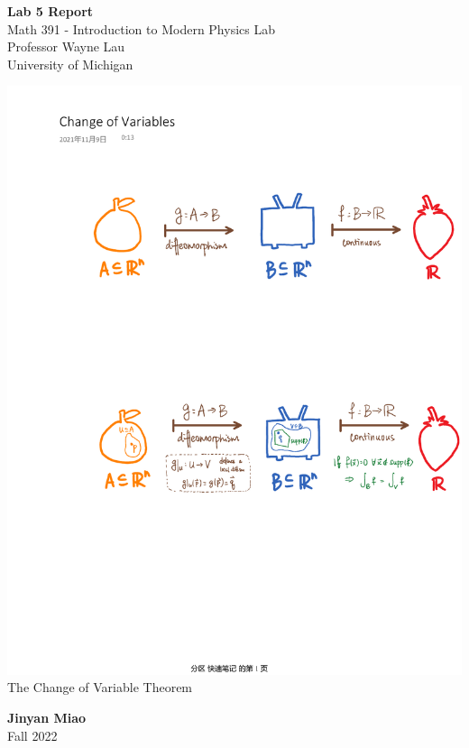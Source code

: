\documentclass[11pt]{book}
\theoremstyle{break}
\theoremstyle{break}
\begin{document}
	\begin{titlepage}
		\begin{center}
			\vspace*{1cm}
			\Huge \color{red}
				\textbf{Lab 5 Report}\\
			\vspace{0.5cm}			
			\Large \color{black}
				Math 391 - Introduction to Modern Physics Lab\\
				Professor Wayne Lau\\	
				University of Michigan\\
			\vspace{3cm}

			\includegraphics[scale=0.8]{cor13.4.pdf}\\
			\color{gray}The Change of Variable Theorem\color{black}
			
			
			\vspace{5cm}
			\LARGE
				\textbf{Jinyan Miao}\\
				\hfill\break
				\LARGE Fall 2022\\
			\vspace{1cm}

		\vspace*{\fill}
		\end{center}			
	\end{titlepage}
\end{document}
